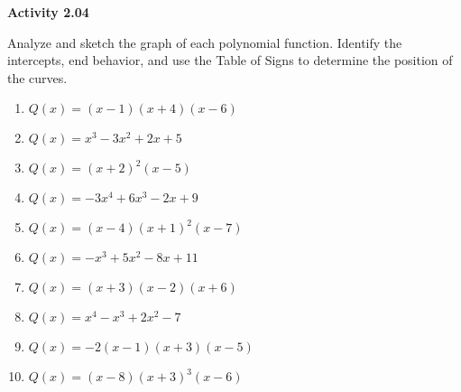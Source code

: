 \vspace{0.3ex}
\noindent\textbf{Activity 2.04}

\vspace{0.2ex}

Analyze and sketch the graph of each polynomial function. Identify the intercepts, end behavior, and use the Table of Signs to determine the position of the curves.
\begin{multicols}{2}
\begin{enumerate}
    \item \( Q(x) = (x - 1)(x + 4)(x - 6) \)
    \item \( Q(x) = x^3 - 3x^2 + 2x + 5 \)
    \item \( Q(x) = (x + 2)^2 (x - 5) \)
    \item \( Q(x) = -3x^4 + 6x^3 - 2x + 9 \)
    \item \( Q(x) = (x - 4)(x + 1)^2(x - 7) \)
    \item \( Q(x) = -x^3 + 5x^2 - 8x + 11 \)
    \item \( Q(x) = (x + 3)(x - 2)(x + 6) \)
    \item \( Q(x) = x^4 - x^3 + 2x^2 - 7 \)
    \item \( Q(x) = -2(x - 1)(x + 3)(x - 5) \)
    \item \( Q(x) = (x - 8)(x + 3)^3(x - 6) \)
\end{enumerate}
\end{multicols}
